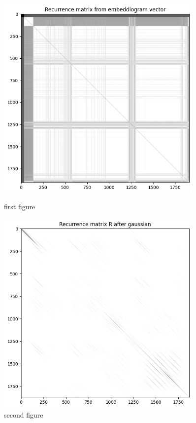 \begin{figure}[ht]
    \centering
    \begin{minipage}{0.45\textwidth}
        \centering
        \includegraphics[width=0.9\textwidth]{figures/images/Rec_matrix_SALAMI_track_2.png} %
        \caption{first figure}
    \end{minipage}\hfill
    \begin{minipage}{0.45\textwidth}
        \centering
        \includegraphics[width=0.9\textwidth]{figures/images/Rec_matrix_smooth_SALAMI_track_2.png} %
        \caption{second figure}
    \end{minipage}
\end{figure}


